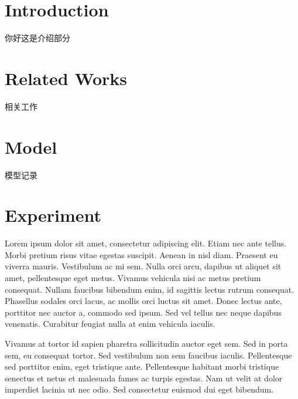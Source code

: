 


\maketitle %


\section*{Introduction}
你好这是介绍部分
\section*{Related Works}
相关工作
\section*{Model}
模型记录
\section*{Experiment}
Lorem ipsum dolor sit amet, consectetur adipiscing elit. Etiam nec ante tellus. Morbi pretium risus vitae egestas suscipit. Aenean in nisl diam. Praesent eu viverra mauris. Vestibulum ac mi sem. Nulla orci arcu, dapibus ut aliquet sit amet, pellentesque eget metus. Vivamus vehicula nisi ac metus pretium consequat. Nullam faucibus bibendum enim, id sagittis lectus rutrum consequat. Phasellus sodales orci lacus, ac mollis orci luctus sit amet. Donec lectus ante, porttitor nec auctor a, commodo sed ipsum. Sed vel tellus nec neque dapibus venenatis. Curabitur feugiat nulla at enim vehicula iaculis.

Vivamus at tortor id sapien pharetra sollicitudin auctor eget sem. Sed in porta sem, eu consequat tortor. Sed vestibulum non sem faucibus iaculis. Pellentesque sed porttitor enim, eget tristique ante. Pellentesque habitant morbi tristique senectus et netus et malesuada fames ac turpis egestas. Nam ut velit at dolor imperdiet lacinia ut nec odio. Sed consectetur euismod dui eget bibendum.

